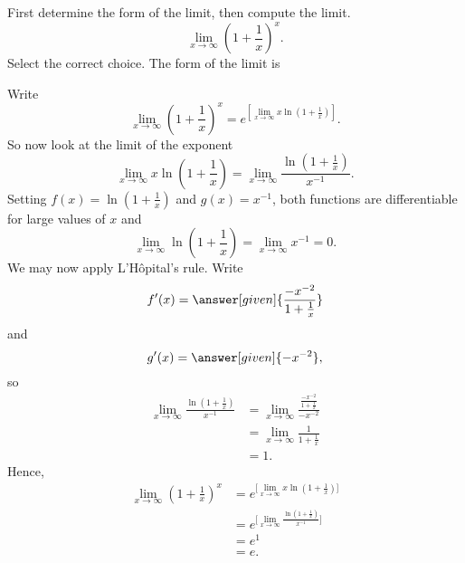 \documentclass{ximera}
\begin{document}
\begin{example}
First determine the form of the limit, then compute the limit.
\[
\lim_{x\to \infty}\left(1 + \frac{1}{x}\right)^x.
\]
  Select the correct choice. The form of the limit is
 \begin{multipleChoice}
 \choice{\ensuremath{\boldsymbol{\tfrac{\infty}{\infty}}}}
 \choice{$\ensuremath{\small\boldsymbol{0\cdot \infty}}$}
 \choice{\ensuremath{\small\boldsymbol{\infty - \infty}}}
  \end{multipleChoice}
\begin{explanation}
Write
\[
\lim_{x\to \infty}\left(1 + \frac{1}{x}\right)^x = e^{\left[\lim_{x\to \infty}x\ln\left(1 + \frac{1}{x}\right)\right]}.
\]
So now look at the limit of the exponent
\[
\lim_{x\to\infty} x\ln\left(1 + \frac{1}{x}\right) = \lim_{x\to\infty} \frac{\ln\left(1 + \frac{1}{x}\right)}{x^{-1}}.
\]
Setting $f(x) = \ln\left(1 + \frac{1}{x}\right)$ and $g(x) = x^{-1}$,
both functions are differentiable for large values of $x$ and
\[
\lim_{x\to \infty}\ln\left(1 + \frac{1}{x}\right)=\lim_{x\to \infty}x^{-1} = 0.
\]
We may now apply L'H\^{o}pital's rule. Write
\[
f'(x) = \answer[given]{\frac{-x^{-2}}{1 + \frac{1}{x}}}
\]
and
\[
g'(x) = \answer[given]{-x^{-2}},
\]
so
\begin{align*}
\lim_{x\to\infty} \frac{\ln\left(1 + \frac{1}{x}\right)}{x^{-1}} &= \lim_{x\to\infty} \frac{\frac{-x^{-2}}{1 + \frac{1}{x}}}{-x^{-2}} \\
&=\lim_{x\to\infty} \frac{1}{1 + \frac{1}{x}}\\
&=1.
\end{align*}
Hence, 
\begin{align*}
  \lim_{x\to \infty}\left(1 + \frac{1}{x}\right)^x &=e^{ \bigg[ \lim_{x\to \infty}x\ln\left(1 + \frac{1}{x}\right) \bigg]} \\
  &=e^{ \bigg[ \lim_{x\to\infty} \frac{\ln\left(1 + \frac{1}{x}\right)}{x^{-1}} \bigg]} \\
  &=e^{1} \\
  &= e.
\end{align*}
\end{explanation}
\end{example}
\end{document}

